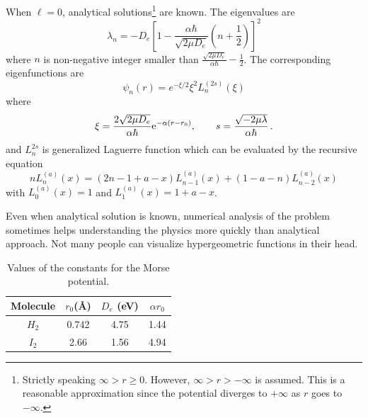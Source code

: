 When $\ell=0$, analytical solutions\footnote{Strictly speaking $\infty > r \ge 0$.  However, $\infty> r > -\infty$ is assumed.  This is a reasonable approximation since the potential diverges to $+\infty$ as $r$ goes to $-\infty$.} are known.\cite{qm_morse}  The eigenvalues are
\begin{equation}
\lambda_n = -D_e \left[ 1-\frac{\alpha \hbar}{\sqrt{2\mu D_e}}
\left( n+\frac{1}{2} \right) \right]^2 
\end{equation}
where $n$ is non-negative integer smaller than $\displaystyle\frac{\sqrt{2\mu D_e}}{\alpha\hbar} - \frac{1}{2}$.
The corresponding eigenfunctions are
\begin{equation}\label{eq:morse_exact}
\psi_n(r) = e^{-\xi/2} \xi^2  L_n^{(2s)} (\xi)
\end{equation}
where
\begin{equation}
\xi = \frac{2\sqrt{2\mu D_e}}{\alpha \hbar} \text{e}^{-\alpha (r-r_0)} , \qquad
s = \frac{\sqrt{-2 \mu \lambda}}{\alpha \hbar}\,.
\end{equation}
and $L_n^{2s}$ is generalized Laguerre function which can be evaluated by the recursive equation
\begin{equation}
n L_n^{(a)} (x) = (2n - 1 + a - x) L_{n-1}^{(a)}(x)
+ (1 - a - n) L_{n-2}^{(a)} (x)
\end{equation}
with $L_0^{(a)}(x) = 1$ and $L_1^{(a)}(x)=1+a-x$.

Even when analytical solution is known, numerical analysis of the problem sometimes helps understanding the physics more quickly than analytical approach. Not many people can visualize hypergeometric functions in their head.


\begin{table}
	\caption{Values of the constants for the Morse potential.}
	\label{tbl:morse}
	\begin{center}
		\begin{tabular}{c|ccc}
			\hline
			Molecule&$r_0$(\AA)&$D_e$ (eV)& $\alpha r_0$ \\
			\hline
			\hline
			$H_2$&0.742&4.75&1.44\\
			$I_2$&2.66&1.56&4.94\\
			\hline
		\end{tabular}
	\end{center}
\end{table}

